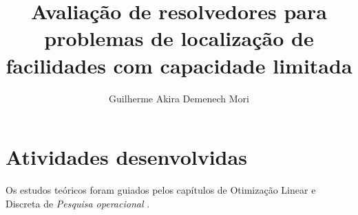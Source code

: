 \documentclass[]{article}
\title{Avaliação de resolvedores para problemas de localização de facilidades com capacidade limitada}
\author{Guilherme Akira Demenech Mori}
\newif\ifrelatorio
\newif\ifartigo
\begin{document}
	\maketitle

	\begin{abstract}
	
	\end{abstract}

\ifrelatorio
	\tableofcontents		
	\ifartigo
		\listoftables
	\fi	
\fi

\ifartigo
	\section{Introdução}
\fi	
	
\ifrelatorio	
	\section{Atividades desenvolvidas}
	
		Os estudos teóricos foram guiados pelos capítulos de Otimização Linear e Discreta de \textit{Pesquisa operacional} \cite{arenales}.	
		
\end{document}
